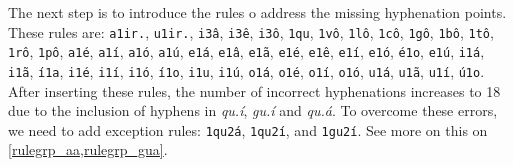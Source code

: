 The next step is to introduce the rules o address the missing hyphenation points. These rules are: 
\texttt{a1ir.}, \texttt{u1ir.}, \texttt{i3â}, \texttt{i3ê}, \texttt{i3ô}, \texttt{1qu}, \texttt{1vô}, \texttt{1lô}, \texttt{1cô}, \texttt{1gô}, \texttt{1bô}, 
\texttt{1tô}, \texttt{1rô}, \texttt{1pô}, \texttt{a1é}, \texttt{a1í}, \texttt{a1ó}, \texttt{a1ú}, \texttt{e1á}, \texttt{e1â}, \texttt{e1ã}, 
\texttt{e1é}, \texttt{e1ê}, \texttt{e1í}, \texttt{e1ó}, \texttt{é1o}, \texttt{e1ú}, \texttt{i1á}, \texttt{i1ã}, \texttt{í1a}, \texttt{i1é}, 
\texttt{i1í}, \texttt{i1ó}, \texttt{í1o}, \texttt{i1u}, \texttt{i1ú}, \texttt{o1á}, \texttt{o1é}, \texttt{o1í}, \texttt{o1ó}, \texttt{u1á}, \texttt{u1ã}, 
\texttt{u1í}, \texttt{ú1o}.
After inserting these rules, the number of incorrect hyphenations increases to 18 due to the inclusion of hyphens in \emph{qu.í}, \emph{gu.í} and \emph{qu.á}. 
To overcome these errors, we need to add exception rules: \texttt{1qu2á}, \texttt{1qu2í}, and \texttt{1gu2í}.
See more on this on \cref{rulegrp_aa,rulegrp_gua}.


